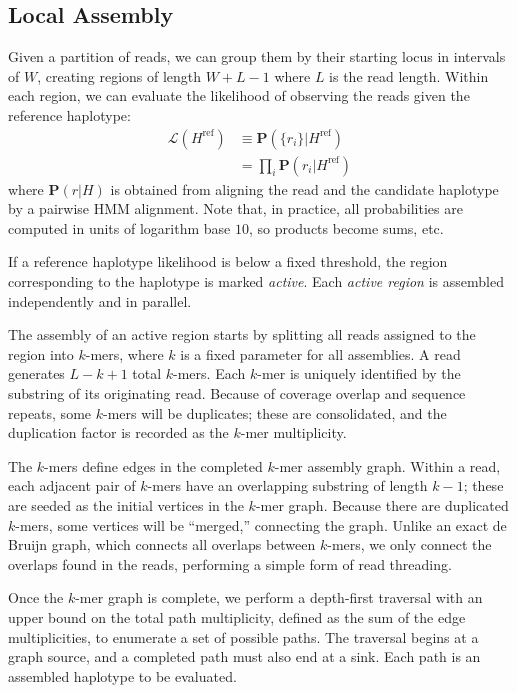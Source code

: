 \documentclass{acm_proc_article-sp}
\begin{document}
\subsection{Local Assembly}
\label{sec:local-assembly}


Given a partition of reads, we can group them by their starting locus in
intervals of $W$, creating regions of length $W+L-1$ where $L$ is the
read length.
Within each region, we can evaluate the likelihood of observing the reads
given the reference haplotype:
\begin{align}
  \mathcal L(H^\text{ref})
  &\equiv\mathbf P(\{r_i\}|H^\text{ref}) \\ \nonumber
  &=\prod_i\mathbf P(r_i|H^\text{ref})
\end{align}
where $\mathbf P(r|H)$ is obtained from aligning the read and the
candidate haplotype by a pairwise HMM alignment.
Note that, in practice, all probabilities are computed in units of logarithm
base $10$, so products become sums, etc.

If a reference haplotype likelihood is below a fixed threshold,
the region corresponding to the haplotype is marked \emph{active}.
Each \emph{active region} is assembled independently and in parallel.


The assembly of an active region starts by splitting all reads assigned to the
region into $k$-mers, where $k$ is a fixed parameter for all assemblies.
A read generates $L-k+1$ total $k$-mers.
Each $k$-mer is uniquely identified by the substring of its originating read.
Because of coverage overlap and sequence repeats, some $k$-mers will be
duplicates;
these are consolidated, and the duplication factor is recorded as the
$k$-mer multiplicity.

The $k$-mers define edges in the completed $k$-mer assembly graph.
Within a read, each adjacent pair of $k$-mers have an overlapping substring of
length $k-1$;
these are seeded as the initial vertices in the $k$-mer graph.
Because there are duplicated $k$-mers, some vertices will be ``merged,''
connecting the graph.
Unlike an exact de Bruijn graph, which connects all overlaps between $k$-mers,
we only connect the overlaps found in the reads, performing a simple form of
read threading.

Once the $k$-mer graph is complete, we perform a depth-first traversal with an
upper bound on the total path multiplicity, defined as the sum of the edge
multiplicities, to enumerate a set of possible paths.
The traversal begins at a graph source, and a completed path must also end at a
sink.
Each path is an assembled haplotype to be evaluated.
\end{document}
